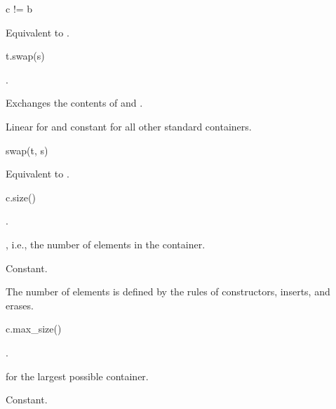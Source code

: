 %
\begin{itemdecl}
c != b
\end{itemdecl}

\begin{itemdescr}
\pnum
\effects
Equivalent to .
\end{itemdescr}

%
\begin{itemdecl}
t.swap(s)
\end{itemdecl}

\begin{itemdescr}
\pnum
\result
{}.

\pnum
\effects
Exchanges the contents of  and .

\pnum
\complexity
Linear for  and constant for all other standard containers.
\end{itemdescr}

\begin{itemdecl}
swap(t, s)
\end{itemdecl}

\begin{itemdescr}
\pnum
\effects
Equivalent to .
\end{itemdescr}

%
\begin{itemdecl}
c.size()
\end{itemdecl}

\begin{itemdescr}
\pnum
\result
{}.

\pnum
\returns
{},
i.e., the number of elements in the container.

\pnum
\complexity
Constant.

\pnum
\remarks
The number of elements is defined by the rules of
constructors, inserts, and erases.
\end{itemdescr}

%
\begin{itemdecl}
c.max_size()
\end{itemdecl}

\begin{itemdescr}
\pnum
\result
{}.

\pnum
\returns
{} for the largest possible container.

\pnum
\complexity
Constant.
\end{itemdescr}

